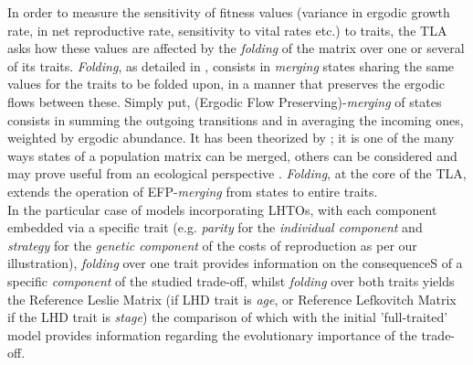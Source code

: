 \documentclass[10pt,a4paper]{article}
\begin{document}
In order to measure the sensitivity of fitness values (variance in ergodic growth rate, in net reproductive rate, sensitivity to vital rates etc.) to traits, the TLA asks how these values are affected by the \emph{folding} of the matrix over one or several of its traits. \emph{Folding}, as detailed in \citep{Coste2017}, consists in \emph{merging} states sharing the same values for the traits to be folded upon, in a manner that preserves the ergodic flows between these.  Simply put, (Ergodic Flow Preserving)-\emph{merging} of states consists in summing the outgoing transitions and in averaging the incoming ones, weighted by ergodic abundance. It has been theorized by \citep{Salguero-Gomez2010a,Hooley2000,Enright1995}; it is one of the many ways states of a population matrix can be merged, others can be considered and may prove useful from an ecological perspective \citep[see, for instance, ][]{Bienvenu2017}. \emph{Folding}, at the core of the TLA, extends the operation of EFP-\emph{merging} from states to entire traits.\\
In the particular case of models incorporating LHTOs, with each component embedded via a specific trait (e.g. \emph{parity} for the \emph{individual component} and \emph{strategy} for the \emph{genetic component} of the costs of reproduction as per our illustration), \emph{folding} over one trait provides information on the consequenceS of a specific \emph{component} of the studied trade-off, whilst \emph{folding} over both traits yields the Reference Leslie Matrix (if LHD trait is \emph{age}, or Reference Lefkovitch Matrix if the LHD trait is \emph{stage}) the comparison of which with the initial 'full-traited' model provides information regarding the evolutionary importance of the trade-off.\\

\end{document}
